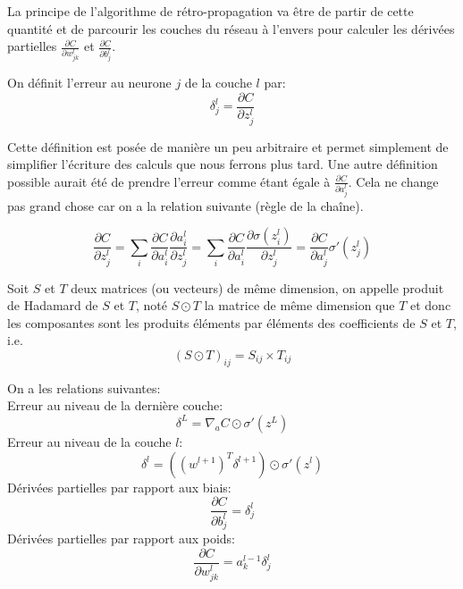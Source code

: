 La principe de l'algorithme de rétro-propagation va être de partir de cette 
quantité et de parcourir les couches du réseau à l'envers pour calculer les 
dérivées partielles $\frac{\partial C}{\partial w_{jk}^{l}}$ et $\frac{\partial C}{\partial b_{j}^{l}}$.

\begin{definition}
On définit l'erreur au neurone $j$ de la couche $l$ par:
\[
\delta_{j}^{l} = \frac{\partial C}{\partial z_{j}^{l}}
\]
\end{definition}

Cette définition est posée de manière un peu arbitraire et permet simplement 
de simplifier l'écriture des calculs que nous ferrons plus tard. 
Une autre définition possible aurait été de prendre l'erreur comme étant égale 
à $\frac{\partial C}{\partial a_{j}^{l}}$. Cela ne change pas grand chose car on 
a la relation suivante (règle de la chaîne).

\[
\frac{\partial C}{\partial z_{j}^{l}} = \sum_{i} \frac{\partial C}{\partial a_{i}^{l}} \frac{\partial a_{i}^{l}}{\partial z_{j}^{l}}
= \sum_{i} \frac{\partial C}{\partial a_{i}^{l}} \frac{\partial \sigma(z_{i}^{l})}{\partial z_{j}^{l}} = \frac{\partial C}{\partial a_{j}^{l}} \sigma'(z_{j}^{l})
\]


\begin{definition}
Soit $S$ et $T$ deux matrices (ou vecteurs) de même dimension, on appelle 
produit de Hadamard de $S$ et $T$, noté $S \odot T$ la matrice de même dimension 
que $T$ et donc les composantes sont les produits éléments par éléments des 
coefficients de $S$ et $T$, i.e.\/
\[
(S \odot T)_{ij} = S_{ij} \times T_{ij}
\]
\end{definition}



\begin{proposition}
On a les relations suivantes: \\
Erreur au niveau de la dernière couche: 
\begin{equation}
  \label{eq:bp1}
\delta^{L} = \nabla_{a} C \odot \sigma'(z^{L})
\end{equation}
Erreur au niveau de la couche $l$:
\begin{equation}
  \label{eq:bp2}
\delta^{l} = ((w^{l+1})^T \delta^{l+1}) \odot \sigma'(z^{l})
\end{equation}
Dérivées partielles par rapport aux biais:
\begin{equation}
  \label{eq:bp3}
\frac{\partial C}{\partial b_{j}^{l}} = \delta_{j}^{l}
\end{equation}
Dérivées partielles par rapport aux poids:
\begin{equation}
  \label{eq:bp4}
\frac{\partial C}{\partial w_{jk}^{l}} = a_{k}^{l-1} \delta_{j}^{l}
\end{equation}
\end{proposition}

